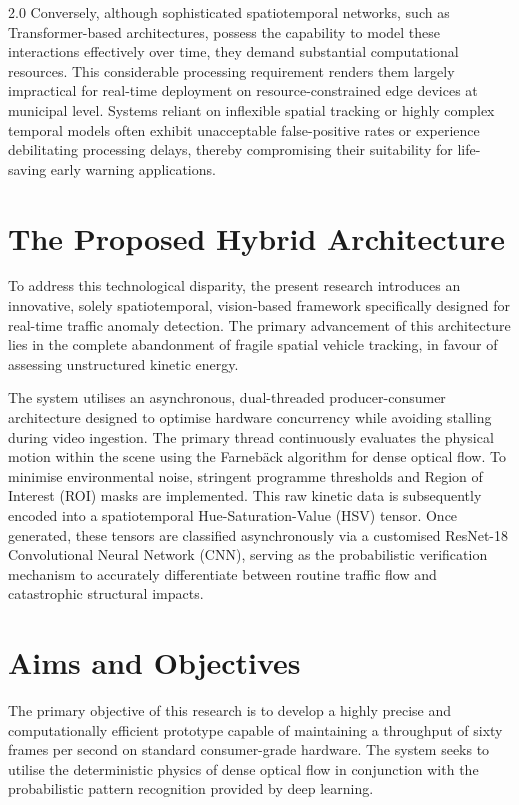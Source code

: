 \begin{spacing}{2.0}
Conversely, although sophisticated spatiotemporal networks, such as Transformer-based architectures, possess the capability to model these interactions effectively over time, they demand substantial computational resources. This considerable processing requirement renders them largely impractical for real-time deployment on resource-constrained edge devices at municipal level. Systems reliant on inflexible spatial tracking or highly complex temporal models often exhibit unacceptable false-positive rates or experience debilitating processing delays, thereby compromising their suitability for life-saving early warning applications.

\section{The Proposed Hybrid Architecture}
To address this technological disparity, the present research introduces an innovative, solely spatiotemporal, vision-based framework specifically designed for real-time traffic anomaly detection. The primary advancement of this architecture lies in the complete abandonment of fragile spatial vehicle tracking, in favour of assessing unstructured kinetic energy.

The system utilises an asynchronous, dual-threaded producer-consumer architecture designed to optimise hardware concurrency while avoiding stalling during video ingestion. The primary thread continuously evaluates the physical motion within the scene using the Farnebäck algorithm for dense optical flow. To minimise environmental noise, stringent programme thresholds and Region of Interest (ROI) masks are implemented. This raw kinetic data is subsequently encoded into a spatiotemporal Hue-Saturation-Value (HSV) tensor. Once generated, these tensors are classified asynchronously via a customised ResNet-18 Convolutional Neural Network (CNN), serving as the probabilistic verification mechanism to accurately differentiate between routine traffic flow and catastrophic structural impacts.


\section{Aims and Objectives}
The primary objective of this research is to develop a highly precise and computationally efficient prototype capable of maintaining a throughput of sixty frames per second on standard consumer-grade hardware. The system seeks to utilise the deterministic physics of dense optical flow in conjunction with the probabilistic pattern recognition provided by deep learning.


\end{spacing}

